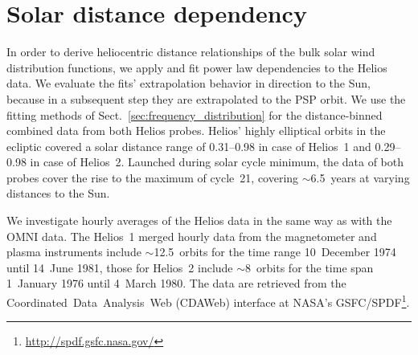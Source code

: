 \section{Solar distance dependency}
\label{sec:solar_distance_dependency}
In order to derive heliocentric distance relationships of the bulk solar wind distribution functions, we apply and fit power law dependencies to the Helios data. We evaluate the fits’ extrapolation behavior in direction to the Sun, because in a subsequent step they are extrapolated to the PSP orbit. We use the fitting methods of Sect.~\ref{sec:frequency_distribution} for the distance-binned combined data from both Helios probes. Helios’ highly elliptical orbits in the ecliptic covered a solar distance range of \SIrange{0.31}{0.98}{\au} in case of Helios~1 and \SIrange{0.29}{0.98}{\au} in case of Helios~2. Launched during solar cycle minimum, the data of both probes cover the rise to the maximum of cycle~21, covering $\sim$6.5~years at varying distances to the Sun.

We investigate hourly averages of the Helios data in the same way as with the OMNI data. The Helios~1 merged hourly data from the magnetometer and plasma instruments \citep{Rosenbauer1977} include $\sim$12.5~orbits for the time range 10~December 1974 until 14~June 1981, those for Helios~2 include $\sim$8~orbits for the time span 1~January 1976 until 4~March 1980. The data are retrieved from the Coordinated~Data~Analysis~Web (CDAWeb) interface at NASA's GSFC/SPDF\footnote{\url{http://spdf.gsfc.nasa.gov/}}.

